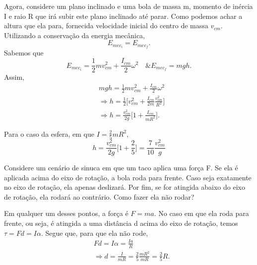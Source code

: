 \documentclass[physicsII_notes.tex]{subfiles}
\begin{document}
Agora, considere um plano inclinado e uma bola de massa m, momento de inércia I e raio R que irá subir este plano inclinado até parar. Como podemos achar a altura que ela para,
fornecida velocidade inicial do centro de massa \(v_{cm}\). Utilizando a conservação da energia mecânica,
\[
	E_{mec_{i}} = E_{mec_{f}}.
\]
Sabemos que
\[
	E_{mec_{i}} = \frac{1}{2}mv_{cm}^{2} + \frac{I_{cm}}{2}\omega ^{2}\quad \& E_{mec_{f}} = mgh.
\]
Assim,
\begin{align*}
	 & mgh = \frac{1}{2} mv_{cm}^{2} + \frac{I_{cm}}{2}\omega^{2}                                      \\
	 & \Rightarrow h = \frac{1}{2}\biggl[v_{cm}^{2} + \frac{I_{cm}}{2m}\frac{v_{cm}^{2}}{R^{2}}\biggr] \\
	 & \Rightarrow h = \frac{v_{cm}^{2}}{2g}\biggl[1 + \frac{I_{cm}}{mR^{2}}\biggr].
\end{align*}
\begin{example}
	Para o caso da esfera, em que \(I = \frac{2}{5}mR^{2},\)
	\[
		h = \frac{v_{cm}^{2}}{2g}\biggl[1 + \frac{2}{5}\biggr] = \frac{7}{10}\frac{v_{cm}^{2}}{g}
	\]
\end{example}
\begin{example}
	Considere um cenário de sinuca em que um taco aplica uma força F. Se ela é aplicada acima do eixo de rotação, a bola roda para frente. Caso seja exatamente no eixo de rotação,
	ela apenas deslizará. Por fim, se for atingida abaixo do eixo de rotação, ela rodará ao contrário. Como fazer ela não rodar?

	Em qualquer um desses pontos, a força é \(F=ma.\) No caso em que ela roda para frente, ou seja, é atingida a uma distância d acima do eixo de rotação,
	temos \(\tau = Fd = I\alpha.\) Segue que, para que ela não rode,
	\begin{align*}
		 & Fd = I\alpha = \frac{Ia}{R}                                                 \\
		 & \Rightarrow d = \frac{I}{mR} = \frac{2}{5}\frac{mR^{2}}{mR} = \frac{2}{5}R.
	\end{align*}
\end{example}
\end{document}
